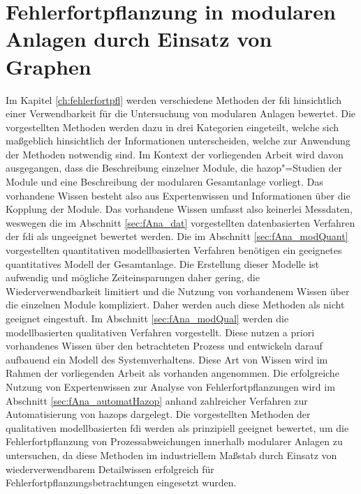 \chapter{Fehlerfortpflanzung in modularen Anlagen durch Einsatz von Graphen}\label{ch:ffpflMod}
Im Kapitel \ref{ch:fehlerfortpfl} werden verschiedene Methoden der \acf{fdi} hinsichtlich einer Verwendbarkeit f\"ur die Untersuchung von modularen Anlagen bewertet. Die vorgestellten Methoden werden dazu in drei Kategorien eingeteilt, welche sich ma\ss{}geblich hinsichtlich der Informationen unterscheiden, welche zur Anwendung der Methoden notwendig sind. Im Kontext der vorliegenden Arbeit wird davon ausgegangen, dass die Beschreibung einzelner Module, die \ac{hazop}"=Studien der Module und eine Beschreibung der modularen Gesamtanlage vorliegt. Das vorhandene Wissen besteht also aus Expertenwissen und Informationen \"uber die Kopplung der Module. Das vorhandene Wissen umfasst also keinerlei Messdaten, weswegen die im Abschnitt \ref{sec:fAna_dat} vorgestellten datenbasierten Verfahren der \ac{fdi} als ungeeignet bewertet werden. \newline
Die im Abschnitt \ref{sec:fAna_modQuant} vorgestellten quantitativen modellbasierten Verfahren ben\"otigen ein geeignetes quantitatives Modell der Gesamtanlage. Die Erstellung dieser Modelle ist aufwendig und m\"ogliche Zeiteinsparungen daher gering, die Wiederverwendbarkeit limitiert und die Nutzung von vorhandenem Wissen \"uber die einzelnen Module kompliziert. Daher werden auch diese Methoden als nicht geeignet eingestuft. \newline
Im Abschnitt \ref{sec:fAna_modQual} werden die modellbasierten qualitativen Verfahren vorgestellt. Diese nutzen a priori vorhandenes Wissen \"uber den betrachteten Prozess und entwickeln darauf aufbauend ein Modell des Systemverhaltens. Diese Art von Wissen wird im Rahmen der vorliegenden Arbeit als vorhanden angenommen. Die erfolgreiche Nutzung von Expertenwissen zur Analyse von Fehlerfortpflanzungen wird im Abschnitt \ref{sec:fAna_automatHazop} anhand zahlreicher Verfahren zur Automatisierung von \acp{hazop} dargelegt. Die vorgestellten Methoden der qualitativen modellbasierten \ac{fdi} werden als prinzipiell geeignet bewertet, um die Fehlerfortpflanzung von Prozessabweichungen innerhalb modularer Anlagen zu untersuchen, da diese Methoden im industriellem Ma\ss{}stab durch Einsatz von wiederverwendbarem Detailwissen erfolgreich f\"ur Fehlerfortpflanzungsbetrachtungen eingesetzt wurden. \newline
